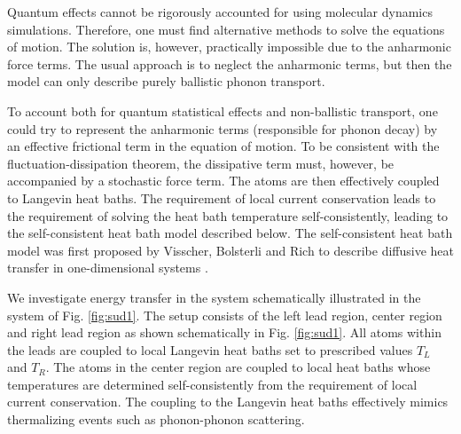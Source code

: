 Quantum effects cannot be rigorously accounted for using molecular dynamics simulations. Therefore, one must find alternative methods to solve the equations of motion. The solution is, however, practically impossible due to the anharmonic force terms. The usual approach is to neglect the anharmonic terms, but then the model can only describe purely ballistic phonon transport. 

To account both for quantum statistical effects and non-ballistic transport, one could try to represent the anharmonic terms (responsible for phonon decay) by an effective frictional term in the equation of motion. To be consistent with the fluctuation-dissipation theorem, the dissipative term must, however, be accompanied by a stochastic force term. The atoms are then effectively coupled to Langevin heat baths. The requirement of local current conservation leads to the requirement of solving the heat bath temperature self-consistently, leading to the self-consistent heat bath model described below. The self-consistent heat bath model was first proposed by Visscher, Bolsterli and Rich to describe diffusive heat transfer in one-dimensional systems \cite{}.

We investigate energy transfer in the system schematically illustrated in the system of Fig. \ref{fig:sud1}. The setup consists of the left lead region, center region and right lead region as shown schematically in Fig. \ref{fig:sud1}. All atoms within the leads are coupled to local Langevin heat baths set to prescribed values $T_L$ and $T_R$. The atoms in the center region are coupled to local heat baths whose temperatures are determined self-consistently from the requirement of local current conservation. The coupling to the Langevin heat baths effectively mimics thermalizing events such as phonon-phonon scattering.

